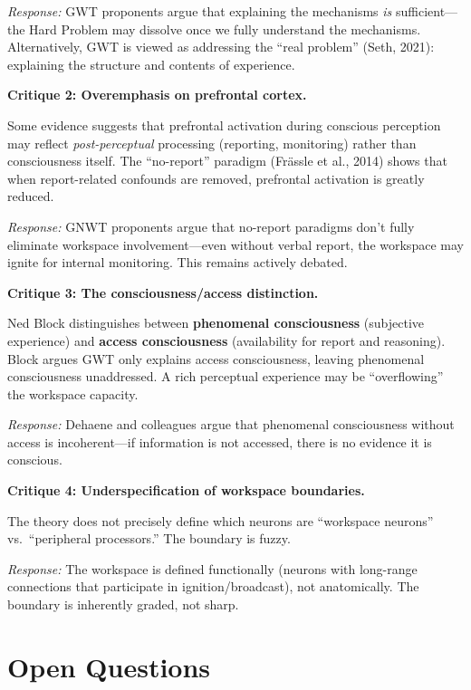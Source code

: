 \documentclass[11pt,a4paper]{report}
\begin{document}
\emph{Response:} GWT proponents argue that explaining the mechanisms \emph{is} sufficient---the Hard Problem may dissolve once we fully understand the mechanisms. Alternatively, GWT is viewed as addressing the ``real problem'' (Seth, 2021): explaining the structure and contents of experience.

\textbf{Critique 2: Overemphasis on prefrontal cortex.}

Some evidence suggests that prefrontal activation during conscious perception may reflect \emph{post-perceptual} processing (reporting, monitoring) rather than consciousness itself. The ``no-report'' paradigm (Frässle et al., 2014) shows that when report-related confounds are removed, prefrontal activation is greatly reduced.

\emph{Response:} GNWT proponents argue that no-report paradigms don't fully eliminate workspace involvement---even without verbal report, the workspace may ignite for internal monitoring. This remains actively debated.

\textbf{Critique 3: The consciousness/access distinction.}

Ned Block distinguishes between \textbf{phenomenal consciousness} (subjective experience) and \textbf{access consciousness} (availability for report and reasoning). Block argues GWT only explains access consciousness, leaving phenomenal consciousness unaddressed. A rich perceptual experience may be ``overflowing'' the workspace capacity.

\emph{Response:} Dehaene and colleagues argue that phenomenal consciousness without access is incoherent---if information is not accessed, there is no evidence it is conscious.

\textbf{Critique 4: Underspecification of workspace boundaries.}

The theory does not precisely define which neurons are ``workspace neurons'' vs.\ ``peripheral processors.'' The boundary is fuzzy.

\emph{Response:} The workspace is defined functionally (neurons with long-range connections that participate in ignition/broadcast), not anatomically. The boundary is inherently graded, not sharp.

\section{Open Questions}
\end{document}
